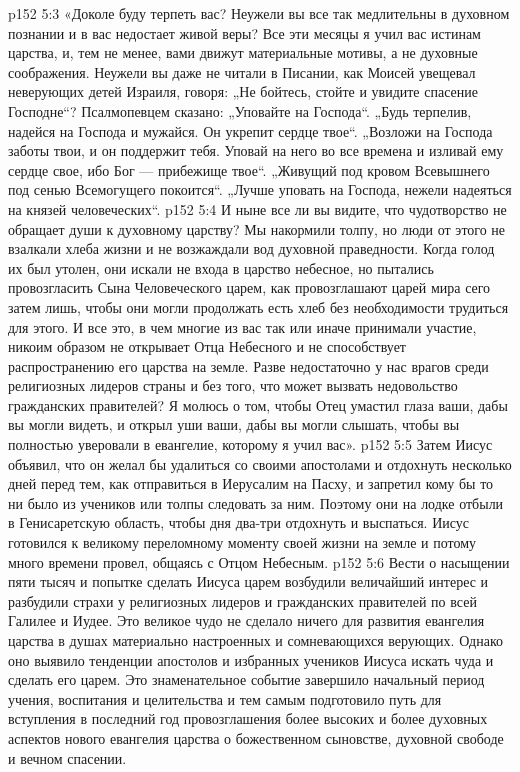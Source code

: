 \vs p152 5:3 \pc «Доколе буду терпеть вас? Неужели вы все так медлительны в духовном познании и в вас недостает живой веры? Все эти месяцы я учил вас истинам царства, и, тем не менее, вами движут материальные мотивы, а не духовные соображения. Неужели вы даже не читали в Писании, как Моисей увещевал неверующих детей Израиля, говоря: „Не бойтесь, стойте и увидите спасение Господне“? Псалмопевцем сказано: „Уповайте на Господа“. „Будь терпелив, надейся на Господа и мужайся. Он укрепит сердце твое“. „Возложи на Господа заботы твои, и он поддержит тебя. Уповай на него во все времена и изливай ему сердце свое, ибо Бог --- прибежище твое“. „Живущий под кровом Всевышнего под сенью Всемогущего покоится“. „Лучше уповать на Господа, нежели надеяться на князей человеческих“.
\vs p152 5:4 И ныне все ли вы видите, что чудотворство не обращает души к духовному царству? Мы накормили толпу, но люди от этого не взалкали хлеба жизни и не возжаждали вод духовной праведности. Когда голод их был утолен, они искали не входа в царство небесное, но пытались провозгласить Сына Человеческого царем, как провозглашают царей мира сего затем лишь, чтобы они могли продолжать есть хлеб без необходимости трудиться для этого. И все это, в чем многие из вас так или иначе принимали участие, никоим образом не открывает Отца Небесного и не способствует распространению его царства на земле. Разве недостаточно у нас врагов среди религиозных лидеров страны и без того, что может вызвать недовольство гражданских правителей? Я молюсь о том, чтобы Отец умастил глаза ваши, дабы вы могли видеть, и открыл уши ваши, дабы вы могли слышать, чтобы вы полностью уверовали в евангелие, которому я учил вас».
\vs p152 5:5 \pc Затем Иисус объявил, что он желал бы удалиться со своими апостолами и отдохнуть несколько дней перед тем, как отправиться в Иерусалим на Пасху, и запретил кому бы то ни было из учеников или толпы следовать за ним. Поэтому они на лодке отбыли в Генисаретскую область, чтобы дня два\hyp{}три отдохнуть и выспаться. Иисус готовился к великому переломному моменту своей жизни на земле и потому много времени провел, общаясь с Отцом Небесным.
\vs p152 5:6 Вести о насыщении пяти тысяч и попытке сделать Иисуса царем возбудили величайший интерес и разбудили страхи у религиозных лидеров и гражданских правителей по всей Галилее и Иудее. Это великое чудо не сделало ничего для развития евангелия царства в душах материально настроенных и сомневающихся верующих. Однако оно выявило тенденции апостолов и избранных учеников Иисуса искать чуда и сделать его царем. Это знаменательное событие завершило начальный период учения, воспитания и целительства и тем самым подготовило путь для вступления в последний год провозглашения более высоких и более духовных аспектов нового евангелия царства о божественном сыновстве, духовной свободе и вечном спасении.
